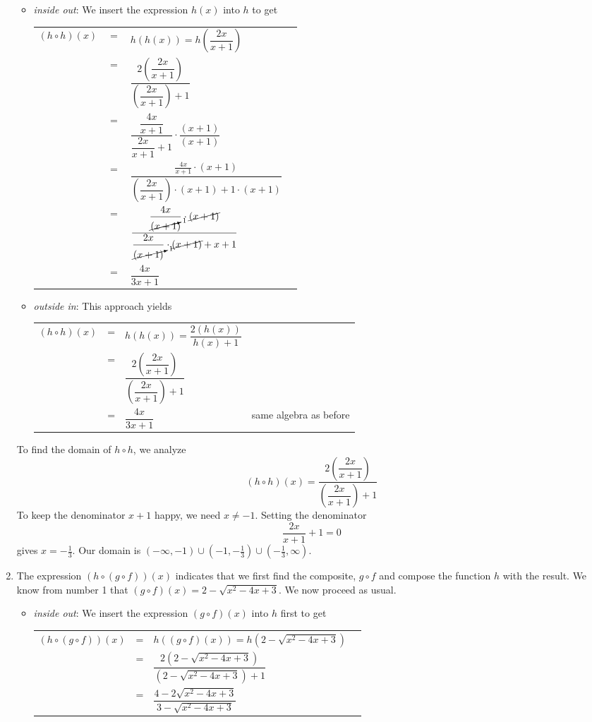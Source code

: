 \begin{ex}
\begin{enumerate}
\begin{itemize}
\item  \textit{inside out}: We insert the expression $h(x)$ into $h$ to get
\begin{longtable}{rclr} $(h \circ h)(x)$ & $=$ & $h(h(x)) =h\left(\dfrac{2x}{x+1}\right)$ & \\ [.25in]
&=& $\dfrac{2\left(\dfrac{2x}{x+1}\right)}{\left(\dfrac{2x}{x+1}\right)+1}$ & \\[.35in] 
 & = & $\dfrac{\dfrac{4x}{x+1}}{\dfrac{2x}{x+1}+1} \cdot \dfrac{(x+1)}{(x+1)}$ & \\ [.25in]
& = & $\dfrac{\frac{4x}{x+1} \cdot (x+1)}{\left(\dfrac{2x}{x+1}\right)\cdot(x+1)+1\cdot(x+1)}$ & \\ [.35in]
& = & $\dfrac{\dfrac{4x}{\cancelto{1}{(x+1})} \cdot \cancel{(x+1)}}{\dfrac{2x}{\cancelto{1}{(x+1)}}\cdot\cancel{(x+1)}+x+1}$ & \\ [.35in]
& = & $\dfrac{4x}{3x+1}$ & \\ 
 \end{longtable}

\item  \textit{outside in}: This approach yields
\begin{longtable}{rclr} $(h \circ h)(x)$ & = & $h(h(x)) = \dfrac{2 (h(x))}{h(x) + 1}$ & \\ [.25in]
& = & $\dfrac{2\left(\dfrac{2x}{x+1}\right)}{\left(\dfrac{2x}{x+1}\right)+1}$ & \\[.35in] 
& = & $\dfrac{4x}{3x+1}$ &  same algebra as before\\
 \end{longtable}

\end{itemize}

To find the domain of $h \circ h$, we analyze \[(h \circ h)(x) = \dfrac{2\left(\dfrac{2x}{x+1}\right)}{\left(\dfrac{2x}{x+1}\right)+1}\]  To keep the denominator $x+1$ happy, we need $x \neq -1$.  Setting the denominator \[\frac{2x}{x+1}+1 = 0\] gives $x = -\frac{1}{3}$.  Our domain is $(-\infty, -1) \cup \left(-1, -\frac{1}{3}\right) \cup \left(-\frac{1}{3}, \infty\right)$. 

\item  The expression $(h \circ (g \circ f))(x)$ indicates that we first find the composite, $g \circ f$ and compose the function $h$ with the result.  We know from number 1 that $(g \circ f)(x) =  2 - \sqrt{x^2-4x+3}$.  We now proceed as usual.

\begin{itemize}

\item  \textit{inside out}: We insert the expression $(g \circ f)(x)$ into $h$ first to get
\begin{longtable}{rclr} $(h \circ (g \circ f))(x)$ & = & $h((g \circ f)(x))=h\left(2 - \sqrt{x^2-4x+3}\right)$  & \\ [5pt]
 & = & $\dfrac{2 \left(2 - \sqrt{x^2-4x+3}\right)}{\left(2 - \sqrt{x^2-4x+3}\right)+1}$ & \\ [12pt]
 & = & $\dfrac{4 - 2\sqrt{x^2-4x+3}}{3 - \sqrt{x^2-4x+3}}$ & \\
 \end{longtable}


\end{itemize}
\end{enumerate}
\end{ex}
